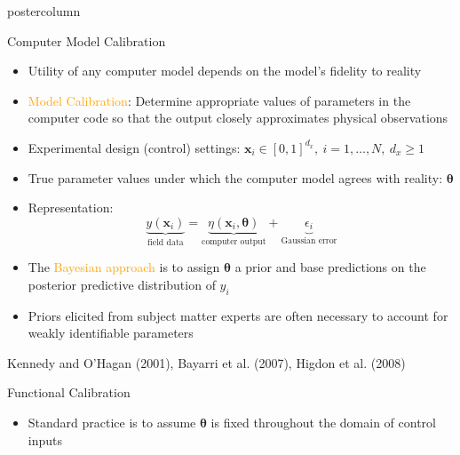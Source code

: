 \documentclass[final,10pt]{beamer}  %
\newcommand{\B}{\boldsymbol}  %
\begin{document}
\begin{frame}{}
\begin{columns}[t]
\begin{column}{.33\textwidth}
\begin{beamercolorbox}[center, wd=1.175\textwidth]{postercolumn}
\begin{minipage}[T]{\textwidth}
{         \begin{block}{Computer Model Calibration}
            {\small
            \begin{itemize}\itemsep2ex
              \item
              Utility of any computer model depends on the model's fidelity to reality

              \item
              \textcolor{orange}{Model Calibration}: Determine appropriate values of parameters in the computer code so that the output closely approximates physical observations


                \item
                Experimental design (control) settings: $\B{x}_i \in [0, 1]^{d_x}, ~i= 1,\ldots, N, ~d_x \geq 1$

                \item
                True parameter values under which the computer model agrees with reality: $\boldsymbol{\theta}$

                \item
                Representation:
                \[
                    \underbrace{y(\B{x}_i)}_{\text{field data}} = \underbrace{\eta(\B{x}_i, \boldsymbol{\theta})}_{\text{computer output}} + \underbrace{\epsilon_i}_{\text{Gaussian error}}
                \]

                \item
                The \textcolor{orange}{Bayesian approach} is to assign $\boldsymbol{\theta}$ a prior and base predictions on the posterior predictive distribution of $y_i$

                \item
                Priors elicited from subject matter experts are often necessary to account for weakly identifiable parameters

            \end{itemize}
            }
            \hfill {\tiny Kennedy and O'Hagan (2001), Bayarri et al. (2007), Higdon et al. (2008)}
        \end{block}
        \vfill

        \begin{block}{Functional Calibration}
        {\small
          \begin{itemize}\itemsep2ex
              \item
              Standard practice is to assume $\boldsymbol{\theta}$ is fixed throughout the domain of control inputs


\end{itemize}}
\end{block}}
\end{minipage}
\end{beamercolorbox}
\end{column}
\end{columns}
\end{frame}
\end{document}
